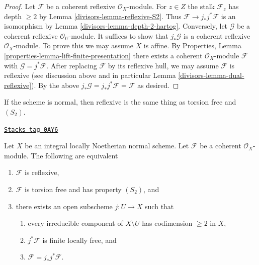 \begin{proof}

Let $\mathcal{F}$ be a coherent reflexive $\mathcal{O}_X$-module. For $z \in Z$
the stalk $\mathcal{F}_z$ has depth $\geq 2$ by Lemma \ref{divisors-lemma-reflexive-S2}.
Thus $\mathcal{F} \to j_*j^*\mathcal{F}$ is an isomorphism by
Lemma \ref{divisors-lemma-depth-2-hartog}. Conversely, let $\mathcal{G}$
be a coherent reflexive $\mathcal{O}_U$-module. It suffices to show that
$j_*\mathcal{G}$ is a coherent reflexive $\mathcal{O}_X$-module.
To prove this we may assume $X$ is affine. By Properties, Lemma
\ref{properties-lemma-lift-finite-presentation}
there exists a coherent $\mathcal{O}_X$-module $\mathcal{F}$
with $\mathcal{G} = j^*\mathcal{F}$. After replacing $\mathcal{F}$
by its reflexive hull, we may assume $\mathcal{F}$ is reflexive
(see discussion above and in particular Lemma \ref{divisors-lemma-dual-reflexive}).
By the above $j_*\mathcal{G} = j_*j^*\mathcal{F} = \mathcal{F}$
as desired.
\end{proof}

If the scheme is normal, then reflexive is the same thing as
torsion free and $(S_2)$.

\begin{lemma}
\label{divisors-lemma-reflexive-over-normal}
\href{https://stacks.math.columbia.edu/tag/0AY6}{\texttt{Stacks tag 0AY6}}

Let $X$ be an integral locally Noetherian normal scheme.
Let $\mathcal{F}$ be a coherent $\mathcal{O}_X$-module.
The following are equivalent
\begin{enumerate}
\item $\mathcal{F}$ is reflexive,
\item $\mathcal{F}$ is torsion free and has property $(S_2)$, and
\item there exists an open subscheme $j : U \to X$ such that
\begin{enumerate}
\item every irreducible component of $X \setminus U$
has codimension $\geq 2$ in $X$,
\item $j^*\mathcal{F}$ is finite locally free, and
\item $\mathcal{F} = j_*j^*\mathcal{F}$.
\end{enumerate}
\end{enumerate}
\end{lemma}

